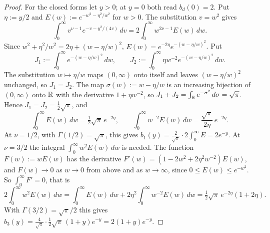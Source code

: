 \begin{proof}
For the closed forms let $y > 0$; at $y = 0$ both read $b_d(0) = 2$. Put $\eta := y/2$ and
$E(w) := e^{-w^2 - \eta^2/w^2}$ for $w > 0$. The substitution $v = w^2$ gives
\[
  \int_0^\infty v^{\nu-1}e^{-v-y^2/(4v)}\,dv = 2\int_0^\infty w^{2\nu-1}E(w)\,dw .
\]
Since $w^2 + \eta^2/w^2 = 2\eta + (w - \eta/w)^2$, $E(w) = e^{-2\eta}e^{-(w - \eta/w)^2}$. Put
\[
  J_1 := \int_0^\infty e^{-(w - \eta/w)^2}\,dw , \qquad
  J_2 := \int_0^\infty \eta w^{-2}e^{-(w - \eta/w)^2}\,dw .
\]
The substitution $w \mapsto \eta/w$ maps $(0, \infty)$ onto itself and leaves $(w - \eta/w)^2$
unchanged, so $J_1 = J_2$. The map $\sigma(w) := w - \eta/w$ is an increasing bijection of
$(0, \infty)$ onto $\mathbb{R}$ with the derivative $1 + \eta w^{-2}$, so
$J_1 + J_2 = \int_{\mathbb{R}}e^{-\sigma^2}\,d\sigma = \sqrt\pi$. Hence $J_1 = J_2 = \tfrac12\sqrt\pi$, and
\[
  \int_0^\infty E(w)\,dw = \tfrac12\sqrt\pi\,e^{-2\eta} , \qquad
  \int_0^\infty w^{-2}E(w)\,dw = \frac{\sqrt\pi}{2\eta}\,e^{-2\eta} .
\]
At $\nu = 1/2$, with $\Gamma(1/2) = \sqrt\pi$, this gives
$b_1(y) = \frac{2}{\sqrt\pi}\cdot2\int_0^\infty E = 2e^{-y}$. At $\nu = 3/2$ the integral
$\int_0^\infty w^2E(w)\,dw$ is needed. The function $F(w) := wE(w)$ has the derivative
$F'(w) = (1 - 2w^2 + 2\eta^2w^{-2})E(w)$, and $F(w) \to 0$ as $w \to 0$ from above and as
$w \to \infty$, since $0 \le E(w) \le e^{-w^2}$. So $\int_0^\infty F' = 0$, that is
\[
  2\int_0^\infty w^2E(w)\,dw = \int_0^\infty E(w)\,dw + 2\eta^2\int_0^\infty w^{-2}E(w)\,dw
   = \tfrac12\sqrt\pi\,e^{-2\eta}(1 + 2\eta) .
\]
With $\Gamma(3/2) = \sqrt\pi/2$ this gives
$b_3(y) = \frac{4}{\sqrt\pi}\cdot\tfrac12\sqrt\pi\,(1 + y)e^{-y} = 2(1 + y)e^{-y}$.
\end{proof}

